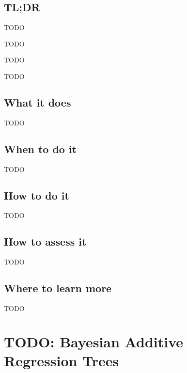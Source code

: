 \documentclass[
]{book}
\providecommand{\tightlist}{%
  \setlength{\itemsep}{0pt}\setlength{\parskip}{0pt}}
\begin{document}
\hypertarget{tldr-17}{%
\section{TL;DR}\label{tldr-17}}

\begin{description}
\tightlist
\item[What it does]
TODO
\item[When to do it]
TODO
\item[How to do it]
TODO
\item[How to assess it]
TODO
\end{description}

\hypertarget{what-it-does-17}{%
\section{What it does}\label{what-it-does-17}}

TODO

\hypertarget{when-to-do-it-17}{%
\section{When to do it}\label{when-to-do-it-17}}

TODO

\hypertarget{how-to-do-it-17}{%
\section{How to do it}\label{how-to-do-it-17}}

TODO

\hypertarget{how-to-assess-it-17}{%
\section{How to assess it}\label{how-to-assess-it-17}}

TODO

\hypertarget{where-to-learn-more-17}{%
\section{Where to learn more}\label{where-to-learn-more-17}}

TODO

\hypertarget{bayesian-additive-regression-trees}{%
\chapter{TODO: Bayesian Additive Regression Trees}\label{bayesian-additive-regression-trees}}
\end{document}
